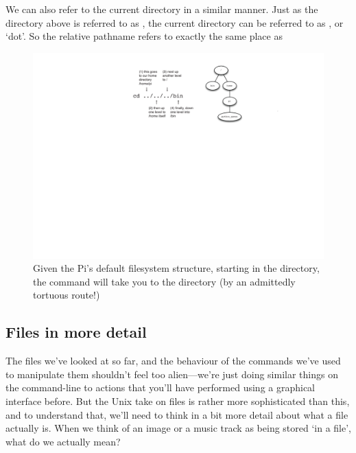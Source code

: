 We can also refer to the current directory in a similar manner. Just as the directory above is referred to as , the current directory can be referred to as , or `dot'. So the relative pathname  refers to exactly the same place as 


\begin{figure}[t]
\centerline{\includegraphics[width=13.5cm]{images/simple-navigation}}
\caption{Given the Pi's default filesystem structure, starting in the  directory, the command  will take you to the  directory (by an admittedly tortuous route!)}\label{figure:simple-navigation}
\end{figure}

\subsection{Files in more detail}

The files we've looked at so far, and the behaviour of the commands we've used to manipulate them shouldn't feel too alien---we're just doing similar things on the command-line to actions that you'll have performed using a graphical interface before. But the Unix take on files is rather more sophisticated than this, and to understand that, we'll need to think in a bit more detail about what a file actually is. When we think of an image or a music track as being stored `in a file', what do we actually mean?


